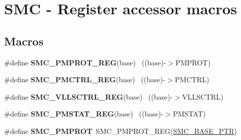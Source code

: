 \hypertarget{group___s_m_c___register___accessor___macros}{}\section{S\+M\+C -\/ Register accessor macros}
\label{group___s_m_c___register___accessor___macros}
\subsection*{Macros}
\begin{DoxyCompactItemize}
\item 
\hypertarget{group___s_m_c___register___accessor___macros_ga376601b24e540392f6d12424bdaebab4}{}\#define {\bfseries S\+M\+C\+\_\+\+P\+M\+P\+R\+O\+T\+\_\+\+R\+E\+G}(base)                                      ~((base)-\/$>$P\+M\+P\+R\+O\+T)\label{group___s_m_c___register___accessor___macros_ga376601b24e540392f6d12424bdaebab4}

\item 
\hypertarget{group___s_m_c___register___accessor___macros_gaa927c65bb4333cf1bcff0d5fa57d8034}{}\#define {\bfseries S\+M\+C\+\_\+\+P\+M\+C\+T\+R\+L\+\_\+\+R\+E\+G}(base)                                      ~((base)-\/$>$P\+M\+C\+T\+R\+L)\label{group___s_m_c___register___accessor___macros_gaa927c65bb4333cf1bcff0d5fa57d8034}

\item 
\hypertarget{group___s_m_c___register___accessor___macros_gaf9878592b3a3adba21106dca7ad03a45}{}\#define {\bfseries S\+M\+C\+\_\+\+V\+L\+L\+S\+C\+T\+R\+L\+\_\+\+R\+E\+G}(base)                                  ~((base)-\/$>$V\+L\+L\+S\+C\+T\+R\+L)\label{group___s_m_c___register___accessor___macros_gaf9878592b3a3adba21106dca7ad03a45}

\item 
\hypertarget{group___s_m_c___register___accessor___macros_ga77ded725e1d8ccc2781a0ee6dffc8809}{}\#define {\bfseries S\+M\+C\+\_\+\+P\+M\+S\+T\+A\+T\+\_\+\+R\+E\+G}(base)                                      ~((base)-\/$>$P\+M\+S\+T\+A\+T)\label{group___s_m_c___register___accessor___macros_ga77ded725e1d8ccc2781a0ee6dffc8809}

\item 
\hypertarget{group___s_m_c___register___accessor___macros_ga43f6628ef790c765722cee208c2c477d}{}\#define {\bfseries S\+M\+C\+\_\+\+P\+M\+P\+R\+O\+T}~S\+M\+C\+\_\+\+P\+M\+P\+R\+O\+T\+\_\+\+R\+E\+G(\hyperlink{group___s_m_c___peripheral_ga31b6c4571795341e6446800243313e56}{S\+M\+C\+\_\+\+B\+A\+S\+E\+\_\+\+P\+T\+R})\label{group___s_m_c___register___accessor___macros_ga43f6628ef790c765722cee208c2c477d}


\end{DoxyCompactItemize}
